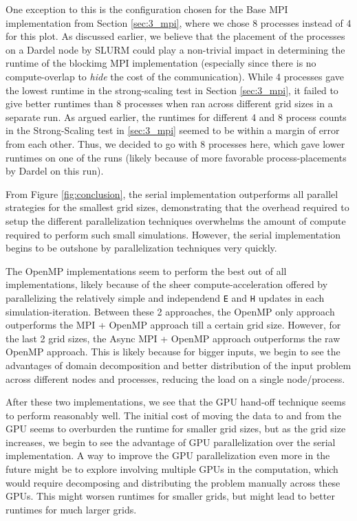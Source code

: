 \documentclass[a4paper,10pt]{article}
\begin{document}
One exception to this is the configuration chosen for the Base MPI implementation from Section \ref{sec:3_mpi}, where we chose 8 processes instead of 4 for this plot. As discussed earlier, we believe that the placement of the processes on a Dardel node by SLURM could play a non-trivial impact in determining the runtime of the blockimg MPI implementation (especially since there is no compute-overlap to \textit{hide} the cost of the communication). While 4 processes gave the lowest runtime in the strong-scaling test in Section \ref{sec:3_mpi}, it failed to give better runtimes than 8 processes when ran across different grid sizes in a separate run. As argued earlier, the runtimes for different 4 and 8 process counts in the Strong-Scaling test in \ref{sec:3_mpi} seemed to be within a margin of error from each other. Thus, we decided to go with 8 processes here, which gave lower runtimes on one of the runs (likely because of more favorable process-placements by Dardel on this run). 

From Figure \ref{fig:conclusion}, the serial implementation outperforms all parallel strategies for the smallest grid sizes, demonstrating that the overhead required to setup the different parallelization techniques overwhelms the amount of compute required to perform such small simulations. However, the serial implementation begins to be outshone by parallelization techniques very quickly.

The OpenMP implementations seem to perform the best out of all implementations, likely because of the sheer compute-acceleration offered by parallelizing the relatively simple and independend \verb|E| and \verb|H| updates in each simulation-iteration. Between these 2 approaches, the OpenMP only approach outperforms the MPI + OpenMP approach till a certain grid size. However, for the last 2 grid sizes, the Async MPI + OpenMP approach outperforms the raw OpenMP approach. This is likely because for bigger inputs, we begin to see the advantages of domain decomposition and better distribution of the input problem across different nodes and processes, reducing the load on a single node/process.

After these two implementations, we see that the GPU hand-off technique seems to perform reasonably well. The initial cost of moving the data to and from the GPU seems to overburden the runtime for smaller grid sizes, but as the grid size increases, we begin to see the advantage of GPU parallelization over the serial implementation. A way to improve the GPU parallelization even more in the future might be to explore involving multiple GPUs in the computation, which would require decomposing and distributing the problem manually across these GPUs. This might worsen runtimes for smaller grids, but might lead to better runtimes for much larger grids. 
\end{document}
